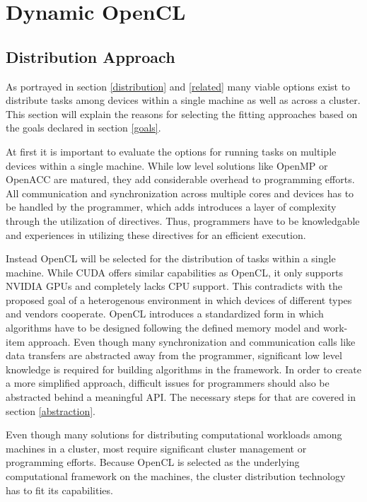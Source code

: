 \chapter{Dynamic OpenCL}

\section{Distribution Approach}

As portrayed in section \ref{distribution} and \ref{related} many viable options exist to distribute tasks among devices within a single machine as well as across a cluster. This section will explain the reasons for selecting the fitting approaches based on the goals declared in section \ref{goals}.

At first it is important to evaluate the options for running tasks on multiple devices within a single machine. While low level solutions like OpenMP or OpenACC are matured, they add considerable overhead to programming efforts. All communication and synchronization across multiple cores and devices has to be handled by the programmer, which adds introduces a layer of complexity through the utilization of directives. Thus, programmers have to be knowledgable and experiences in utilizing these directives for an efficient execution.

Instead OpenCL will be selected for the distribution of tasks within a single machine. While CUDA offers similar capabilities as OpenCL, it only supports NVIDIA GPUs and completely lacks CPU support. This contradicts with the proposed goal of a heterogenous environment in which devices of different types and vendors cooperate. OpenCL introduces a standardized form in which algorithms have to be designed following the defined memory model and work-item approach. Even though many synchronization and communication calls like data transfers are abstracted away from the programmer, significant low level knowledge is required for building algorithms in the framework. In order to create a more simplified approach, difficult issues for programmers should also be abstracted behind a meaningful API. The necessary steps for that are covered in section \ref{abstraction}.

Even though many solutions for distributing computational workloads among machines in a cluster, most require significant cluster management or programming efforts. Because OpenCL is selected as the underlying computational framework on the machines, the cluster distribution technology has to fit its capabilities.

